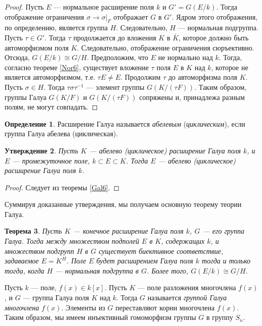 \documentclass[12pt, titlepage, oneside]{amsbook}
\newtheorem{theorem}{Теорема}[chapter]
\newtheorem{claim}[theorem]{Утверждение}
\theoremstyle{definition}
\newtheorem{definition}[theorem]{Определение}
\theoremstyle{remark}
\begin{document}
\begin{proof}
Пусть $E$ --- нормальное расширение поля $k$ и $G'=G(E/k)$. Тогда отображение ограничения $\sigma\rightarrow\sigma|_F$ отображает $G$ в $G'$. Ядром этого отображения, по определению, является группа $H$. Следовательно, $H$ --- нормальная подгруппа. Пусть $\tau\in G'$. Тогда $\tau$ продолжается до вложения $K$ в $\bar{K}$, которое должно быть автоморфизмом поля $K$. Следовательно, отображение ограничения сюръективно. Отсюда, $G(E/k)\cong G/H$. Предположим, что $E$ не нормально над $k$. Тогда, согласно теореме \ref{Nor6}, существует вложение $\tau$ поля $E$ в $K$ над $k$, которое не является автоморфизмом, т.е. $\tau E\neq E$. Продолжим $\tau$ до автоморфизма поля $K$. Пусть $\sigma\in H$. Тогда $\tau\sigma\tau^{-1}$ --- элемент группы $G(K/(\tau F))$. Таким образом, группы Галуа $G(K/ F)$ и $G(K/(\tau F))$ сопряжены и, принадлежа разным полям, не могут совпадать.
\end{proof}


\begin{definition}
Расширение Галуа называется \emph{абелевым} (\emph{циклическим}), если группа Галуа абелева (циклическая).
\end{definition}

 \begin{claim}
\label{Gal7}
Пусть $K$ --- абелево (циклическое) расширение Галуа поля $k$, и $E$ --- промежуточное поле, $k\subset E\subset K$. Тогда $E$ --- абелево (циклическое) расширение Галуа поля $k$.
\end{claim}

\begin{proof}
Следует из теоремы \ref{Gal6}.
\end{proof}

Суммируя доказанные утверждения, мы получаем основную теорему теории Галуа.

\begin{theorem}
\label{Gal8}
Пусть $K$ --- конечное расширение Галуа поля $k$, $G$ --- его группа Галуа. Тогда между множеством подполей $E$ в $K$, содержащих $k$, и множеством подгрупп $H$ в $G$ существует биективное соответствие, задаваемое $E=K^H$. Поле $E$ будет расширением Галуа поля $k$ тогда и только тогда, когда $H$ --- нормальная подгруппа в $G$. Более того, $G(E/k)\cong G/H$.
\end{theorem}

Пусть $k$ --- поле, $f(x)\in k[x]$. Пусть $K$ --- поле разложения многочлена $f(x)$, и $G$ --- группа Галуа поля $K$ над $k$. Тогда $G$ называется \emph{группой Галуа многочлена} $f(x)$. Элементы из $G$ переставляют корни многочлена $f(x)$. Таким образом, мы имеем инъективный гомоморфизм группы $G$ в группу $S_n$.
\end{document}
